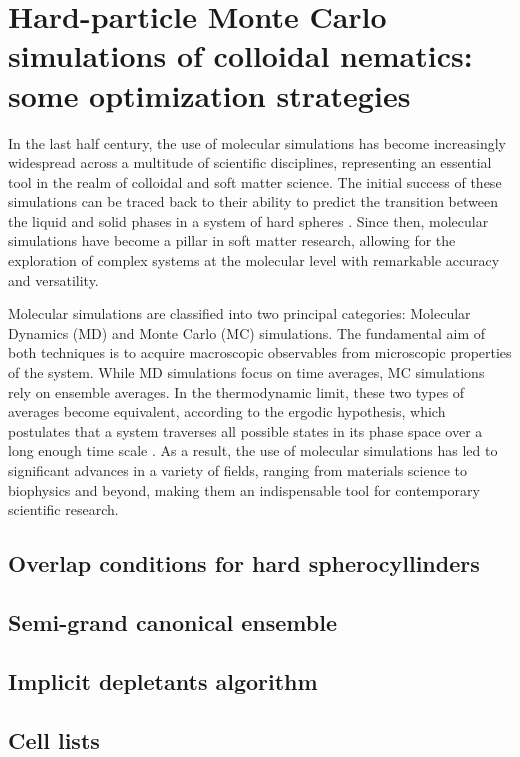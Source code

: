 \section[HPMC simulations of colloidal nematics]{Hard-particle Monte Carlo simulations of colloidal nematics: some optimization strategies}

In the last half century, the use of molecular simulations has become increasingly widespread across a multitude of scientific disciplines, representing an essential tool in the realm of colloidal and soft matter science. The initial success of these simulations can be traced back to their ability to predict the transition between the liquid and solid phases in a system of hard spheres \cite{ALDER57,WOOD57}. Since then, molecular simulations have become a pillar in soft matter research, allowing for the exploration of complex systems at the molecular level with remarkable accuracy and versatility.

Molecular simulations are classified into two principal categories: Molecular Dynamics (MD) and Monte Carlo (MC) simulations. The fundamental aim of both techniques is to acquire macroscopic observables from microscopic properties of the system. While MD simulations focus on time averages, MC simulations rely on ensemble averages. In the thermodynamic limit, these two types of averages become equivalent, according to the ergodic hypothesis, which postulates that a system traverses all possible states in its phase space over a long enough time scale \cite{dfrenkel96:mc}. As a result, the use of molecular simulations has led to significant advances in a variety of fields, ranging from materials science to biophysics and beyond, making them an indispensable tool for contemporary scientific research.

\subsection{Overlap conditions for hard spherocyllinders}

\subsection{Semi-grand canonical ensemble}

\subsection{Implicit depletants algorithm}

\subsection{Cell lists}

\clearpage